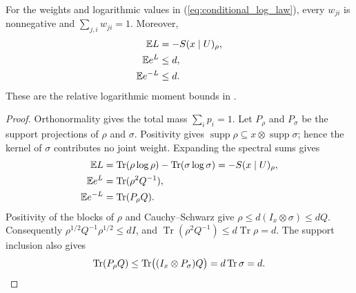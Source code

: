 \begin{theorem}
    \label{thm:conditional_relative_log_moments}
    \leanok
    For the weights and logarithmic values in
    (\ref{eq:conditional_log_law}), every $w_{ji}$ is nonnegative and
    $\sum_{j,i}w_{ji}=1$. Moreover,
    \begin{align}
        \mathbb E L&=-S(x\mid U)_\rho,\notag\\
        \mathbb E e^L&\le d,\notag\\
        \mathbb E e^{-L}&\le d.\notag
    \end{align}
    These are the relative logarithmic moment bounds in
    \cite[Section~5.1]{OpenAI2026AreaLaw}.
\end{theorem}
\begin{proof}\leanok
    Orthonormality gives the total mass $\sum_i p_i=1$.
    Let $P_\rho$ and $P_\sigma$ be the support projections of $\rho$ and
    $\sigma$. Positivity gives
    $\operatorname{supp}\rho\subseteq x\otimes\operatorname{supp}\sigma$;
    hence the kernel of $\sigma$ contributes no joint weight.
    Expanding the spectral sums gives
    \begin{align}
        \mathbb E L
        &=\operatorname{Tr}(\rho\log\rho)
          -\operatorname{Tr}(\sigma\log\sigma)
          =-S(x\mid U)_\rho,\notag\\
        \mathbb E e^L&=\operatorname{Tr}(\rho^2Q^{-1}),\notag\\
        \mathbb E e^{-L}&=\operatorname{Tr}(P_\rho Q).\notag
    \end{align}
    Positivity of the blocks of $\rho$ and Cauchy--Schwarz give
    $\rho\le d(I_x\otimes\sigma)\le dQ$.
    Consequently $\rho^{1/2}Q^{-1}\rho^{1/2}\le dI$, and
    $\operatorname{Tr}(\rho^2Q^{-1})\le d\operatorname{Tr}\rho=d$.
    The support inclusion also gives
    \begin{align}
        \operatorname{Tr}(P_\rho Q)
        \le\operatorname{Tr}\bigl((I_x\otimes P_\sigma)Q\bigr)
        =d\operatorname{Tr}\sigma=d.\notag
    \end{align}
\end{proof}

